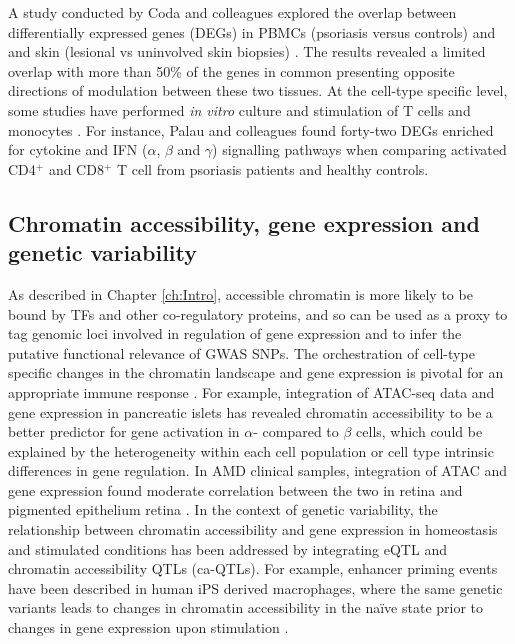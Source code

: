 A study conducted by Coda and colleagues explored the overlap between differentially expressed genes (DEGs) in PBMCs (psoriasis versus controls) and and skin (lesional vs uninvolved skin biopsies) \parencite{Coda2012}. The results revealed a limited overlap with more than 50\% of the genes in common presenting opposite directions of modulation between these two tissues. At the cell-type specific level, some studies have performed \textit{in vitro} culture and stimulation of T cells and monocytes \parencite{Palau2013, Jung2004}. For instance, Palau and colleagues found forty-two DEGs enriched for cytokine and IFN ($\alpha$, $\beta$ and $\gamma$) signalling pathways when comparing activated CD4$^+$ and CD8$^+$ T cell from psoriasis patients and healthy controls. %


\subsection{Chromatin accessibility, gene expression and genetic variability}
As described in Chapter \ref{ch:Intro}, accessible chromatin is more likely to be bound by TFs and other co-regulatory proteins, and so can be used as a proxy to tag genomic loci involved in regulation of gene expression and to infer the putative functional relevance of GWAS SNPs. The orchestration of cell-type specific changes in the chromatin landscape and gene expression is pivotal for an appropriate immune response \parencite{Goodnow2005}. For example, integration of ATAC-seq data and gene expression in pancreatic islets has revealed chromatin accessibility to be a better predictor for gene activation in $\alpha$- compared to $\beta$ cells, which could be explained by the heterogeneity within each cell population or cell type intrinsic differences in gene regulation. In AMD clinical samples, integration of ATAC and gene expression found moderate correlation between the two in retina and pigmented epithelium retina \parencite{Wang2018}. In the context of genetic variability, the relationship between chromatin accessibility and gene expression in homeostasis and stimulated conditions has been addressed by integrating eQTL and chromatin accessibility QTLs (ca-QTLs). For example, enhancer priming events have been described in human iPS derived macrophages, where the same genetic variants leads to changes in chromatin accessibility in the na\"{i}ve state prior to changes in gene expression upon stimulation \parencite{Alasoo2018}. 



